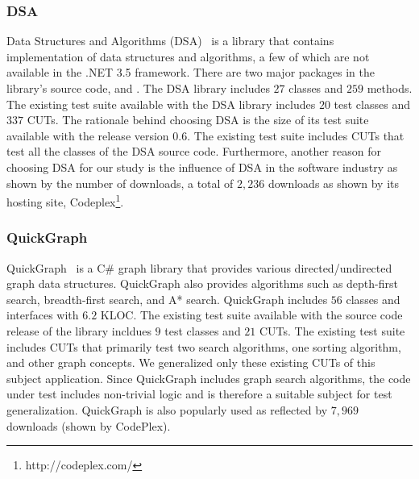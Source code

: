 \subsubsection{DSA}

Data Structures and Algorithms (DSA)~\cite{dsa} is a library that contains implementation of data structures and algorithms, a few of which are not available in the .NET 3.5 framework. There are two major packages in the library's source code,  and . The DSA library includes $27$ classes and $259$ methods. The existing test suite available with the DSA library includes $20$ test classes and $337$ CUTs. The rationale behind choosing DSA is the size of its test suite available with the release version $0.6$. The existing test suite includes CUTs that test all the classes of the DSA source code. Furthermore, another reason for choosing DSA for our study is the influence of DSA in the software industry as shown by the number of downloads, a total of $2,236$ downloads as shown by its hosting site, Codeplex\footnote{http://codeplex.com/}. 

\subsubsection{QuickGraph}

QuickGraph~\cite{quickgraph} is a C\# graph library that provides various directed/undirected graph data structures. QuickGraph also provides algorithms such as depth-first search, breadth-first search, and A* search. QuickGraph includes $56$ classes and interfaces with $6.2$ KLOC. The existing test suite available with the source code release of the library incldues $9$ test classes and $21$ CUTs. The existing test suite includes CUTs that primarily test two search algorithms, one sorting algorithm, and other graph concepts. We generalized only these existing CUTs of this subject application. Since QuickGraph includes graph search algorithms, the code under test includes non-trivial logic and is therefore a suitable subject for test generalization. QuickGraph is also popularly used as reflected by $7,969$ downloads (shown by CodePlex).



